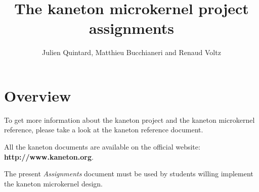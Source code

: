 
%
%



%
%


%
%

\title{The kaneton microkernel project assignments
       \logos}

%
%

\author{\small{Julien Quintard},
        \small{Matthieu Bucchianeri} and
        \small{Renaud Voltz}}

%
%



%
%

\maketitle

\newpage

\tableofcontents

\newpage

%
%

%
%

\section{Overview}

To get more information about the kaneton project and the kaneton
microkernel reference, please take a look at the kaneton reference
document.

All the kaneton documents are available on the official website:
\textbf{http://www.kaneton.org}.

The present \textit{Assignments} document must be used by students
willing implement the kaneton microkernel design.




%
%


